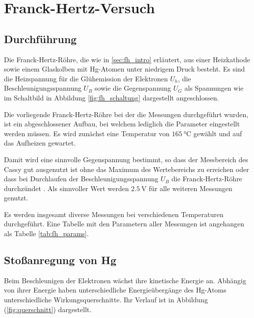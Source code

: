 \chapter{Franck-Hertz-Versuch}

\section{Durchführung}
Die Franck-Hertz-Röhre, die wie in \ref{sec:fh_intro} erläutert, aus einer Heizkathode sowie einem Glaskolben mit Hg-Atomen unter niedrigem Druck besteht\cite[687-688]{gerthsen}. Es sind die Heizspannung für die Glühemission der Elektronen $U_h$, die Beschleunigungsspannung $U_B$ sowie die Gegenspannung $U_G$ als Spannungen wie im Schaltbild in Abbildung \ref{fig:fh_schaltung} dargestellt angeschlossen.


Die vorliegende Franck-Hertz-Röhre bei der die Messungen durchgeführt wurden, ist ein abgeschlossener Aufbau, bei welchem lediglich die Parameter eingestellt werden müssen. Es wird zunächst eine Temperatur von $\SI{165}{\celsius}$ gewählt und auf das Aufheizen gewartet.

Damit wird eine sinnvolle Gegenspannung bestimmt, so dass der Messbereich des Cassy gut ausgenutzt ist ohne das Maximum des Wertebereichs zu erreichen oder dass bei Durchlaufen der Beschleunigungsspannung $U_B$ die Franck-Hertz-Röhre durchzündet \cite[10-11]{Versuchsanleitung401}. Als sinnvoller Wert werden $\SI{2.5}{\volt}$ für alle weiteren Messungen genutzt.

Es werden insgesamt diverse Messungen bei verschiedenen Temperaturen durchgeführt. Eine Tabelle mit den Parametern aller Messungen ist angehangen als Tabelle \ref{tab:fh_params}.


\section{Stoßanregung von Hg}
Beim Beschleunigen der Elektronen wächst ihre kinetische Energie an. Abhängig von ihrer Energie haben unterschiedliche Energieübergänge des Hg-Atoms unterschiedliche Wirkungsquerschnitte. Ihr Verlauf ist in Abbildung (\ref{fig:querschnitt}) dargestellt.


